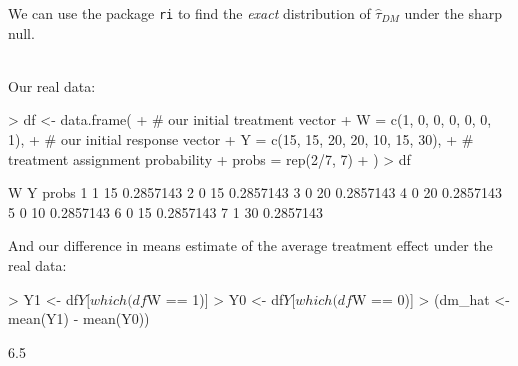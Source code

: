 \documentclass[xcolor={dvipsnames},handout]{beamer}
\begin{document}

\begin{frame}[fragile]
\renewcommand{\Sweavesize}{\scriptsize}
We can use the package \texttt{ri} to find the \textit{exact} distribution of $\hat\tau_{DM}$ under the sharp null. \\~\

Our real data:
\scriptsize
\begin{Schunk}
\begin{Sinput}
> df <- data.frame(
+         # our initial treatment vector
+         W = c(1, 0, 0, 0, 0, 0, 1),
+         # our initial response vector
+         Y = c(15, 15, 20, 20, 10, 15, 30),
+         # treatment assignment probability
+         probs = rep(2/7, 7)
+ )
> df
\end{Sinput}
\begin{Soutput}
  W  Y     probs
1 1 15 0.2857143
2 0 15 0.2857143
3 0 20 0.2857143
4 0 20 0.2857143
5 0 10 0.2857143
6 0 15 0.2857143
7 1 30 0.2857143
\end{Soutput}
\end{Schunk}



\end{frame}



\begin{frame}[fragile]
\renewcommand{\Sweavesize}{\scriptsize}


And our difference in means estimate of the average treatment effect under the real data:

\begin{Schunk}
\begin{Sinput}
> Y1 <- df$Y[which(df$W == 1)]
> Y0 <- df$Y[which(df$W == 0)]
> (dm_hat <- mean(Y1) - mean(Y0))
\end{Sinput}
\begin{Soutput}
[1] 6.5
\end{Soutput}
\end{Schunk}


\end{frame}
\end{document}

